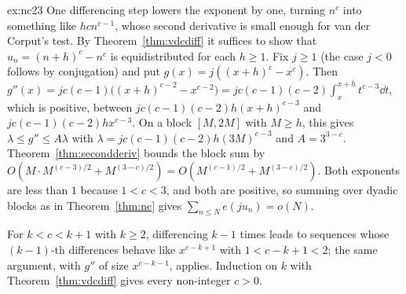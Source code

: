 \begin{solution}{ex:nc23}
\idea One differencing step lowers the exponent by one, turning $n^c$ into something like $hcn^{c-1}$, whose second derivative is small enough for van der Corput's test.
\writeup By Theorem~\ref{thm:vdcdiff} it suffices to show that $u_n=(n+h)^c-n^c$ is equidistributed for each $h\ge1$. Fix $j\ge1$ (the case $j<0$ follows by conjugation) and put $g(x)=j((x+h)^c-x^c)$. Then
$g''(x)=jc(c-1)\bigl((x+h)^{c-2}-x^{c-2}\bigr)=jc(c-1)(c-2)\int_x^{x+h}t^{c-3}\dd t$, which is positive, between $jc(c-1)(c-2)h(x+h)^{c-3}$ and $jc(c-1)(c-2)hx^{c-3}$. On a block $[M,2M]$ with $M\ge h$, this gives
$\lambda\le g''\le A\lambda$ with $\lambda=jc(c-1)(c-2)h(3M)^{c-3}$ and $A=3^{3-c}$. Theorem~\ref{thm:secondderiv} bounds the block sum by $O(M\cdot M^{(c-3)/2}+M^{(3-c)/2})=O(M^{(c-1)/2}+M^{(3-c)/2})$. Both exponents are less than $1$
because $1<c<3$, and both are positive, so summing over dyadic blocks as in Theorem~\ref{thm:nc} gives $\sum_{n\le N}e(ju_n)=o(N)$.

For $k<c<k+1$ with $k\ge2$, differencing $k-1$ times leads to sequences whose $(k-1)$-th differences behave like $x^{c-k+1}$ with $1<c-k+1<2$; the same argument, with $g''$ of size $x^{c-k-1}$, applies.
Induction on $k$ with Theorem~\ref{thm:vdcdiff} gives every non-integer $c>0$.
\end{solution}

